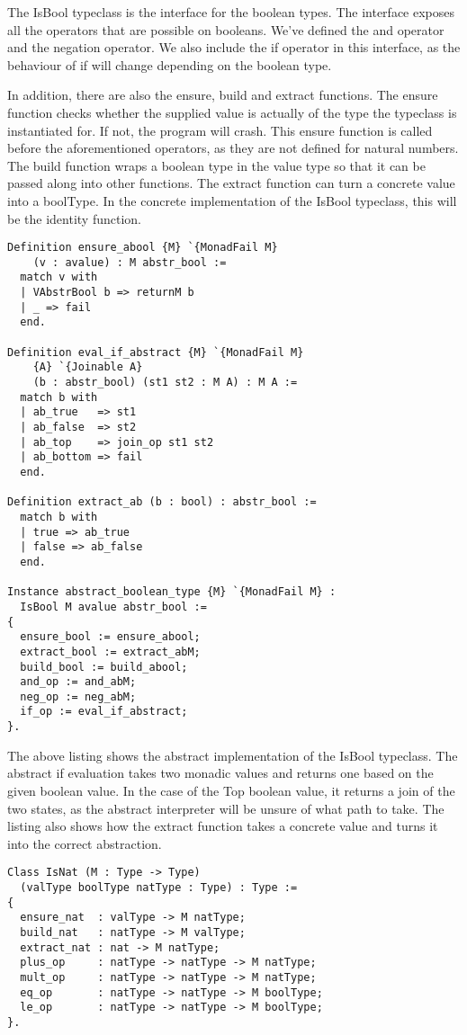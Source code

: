 The IsBool typeclass is the interface for the boolean types. The interface
exposes all the operators that are possible on booleans. We've defined the and
operator and the negation operator. We also include the if operator in this
interface, as the behaviour of if will change depending on the boolean type. 

In addition, there are also the ensure, build and extract functions. The ensure
function checks whether the supplied value is actually of the type the
typeclass is instantiated for. If not, the program will crash. This ensure
function is called before the aforementioned operators, as they are not defined
for natural numbers. The build function wraps a boolean type in the value type
so that it can be passed along into other functions. The extract function can
turn a concrete value into a boolType. In the concrete implementation
of the IsBool typeclass, this will be the identity function.

\begin{verbatim}
Definition ensure_abool {M} `{MonadFail M} 
    (v : avalue) : M abstr_bool :=
  match v with
  | VAbstrBool b => returnM b
  | _ => fail
  end.

Definition eval_if_abstract {M} `{MonadFail M} 
    {A} `{Joinable A} 
    (b : abstr_bool) (st1 st2 : M A) : M A :=
  match b with
  | ab_true   => st1
  | ab_false  => st2
  | ab_top    => join_op st1 st2
  | ab_bottom => fail
  end.

Definition extract_ab (b : bool) : abstr_bool := 
  match b with
  | true => ab_true
  | false => ab_false
  end.

Instance abstract_boolean_type {M} `{MonadFail M} : 
  IsBool M avalue abstr_bool :=
{
  ensure_bool := ensure_abool;
  extract_bool := extract_abM;
  build_bool := build_abool;
  and_op := and_abM;
  neg_op := neg_abM;
  if_op := eval_if_abstract;
}.
\end{verbatim}

The above listing shows the abstract implementation of the IsBool typeclass.
The abstract if evaluation takes two monadic values and returns one based on the
given boolean value. In the case of the Top boolean value, it returns a join of
the two states, as the abstract interpreter will be unsure of what path to
take. The listing also shows how the extract function takes a concrete value
and turns it into the correct abstraction.

\begin{verbatim}
Class IsNat (M : Type -> Type)
  (valType boolType natType : Type) : Type :=
{
  ensure_nat  : valType -> M natType;
  build_nat   : natType -> M valType;
  extract_nat : nat -> M natType;
  plus_op     : natType -> natType -> M natType;
  mult_op     : natType -> natType -> M natType;
  eq_op       : natType -> natType -> M boolType;
  le_op       : natType -> natType -> M boolType;
}.
\end{verbatim}

